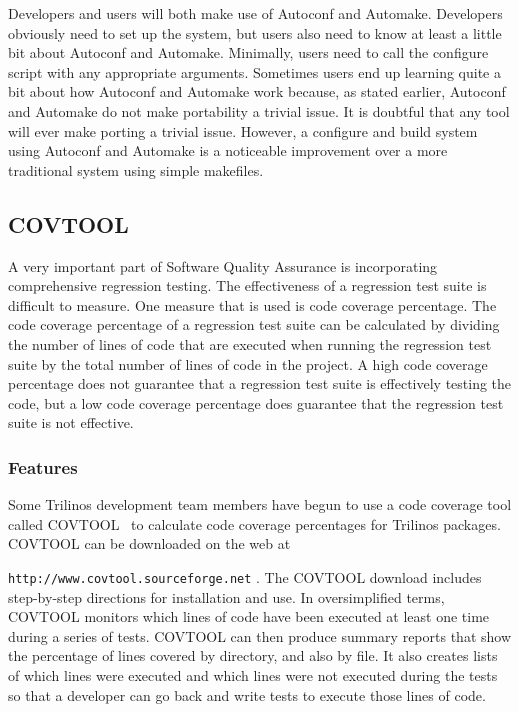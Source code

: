 \documentclass[12pt,relax]{article}
\newcommand{\InlineDirectory}[1]{
  {\hspace{0.01 in}} {\tt #1} {\hspace{0.01 in}}}
\begin{document}
Developers and users will both make use of Autoconf and Automake.  Developers 
obviously need to set up the system, but users also need to know at least a 
little bit about Autoconf and Automake.  Minimally, users need to call the 
configure script with any appropriate arguments.  Sometimes users end up 
learning quite a bit about how Autoconf and Automake work because, as stated 
earlier, Autoconf and Automake do not make portability a trivial issue.  It is 
doubtful that any tool will ever make porting a trivial issue.  However, a 
configure and build system using Autoconf and Automake is a 
noticeable improvement over a more traditional system using simple makefiles.

\subsection{COVTOOL}

A very important part of Software Quality Assurance is incorporating 
comprehensive regression testing.  The effectiveness of a regression test 
suite is 
difficult to measure.  One measure that is used is code coverage percentage.  
The code coverage percentage of a regression test suite can be calculated by 
dividing the number of lines of code that are executed when running the 
regression test suite by the total number of lines of code in the project.
A high code coverage percentage does not guarantee that a regression test 
suite is effectively testing the code, but a low code coverage percentage does 
guarantee that the regression test suite is not effective.

\subsubsection{Features}

Some Trilinos development team members have begun to use a code coverage tool 
called COVTOOL~\cite{COVTOOL} to calculate code coverage percentages for 
Trilinos packages.  COVTOOL can be downloaded on the web at \newline
\InlineDirectory{http://www.covtool.sourceforge.net}.  The COVTOOL download 
includes step-by-step directions for installation and use.  In oversimplified
terms, COVTOOL monitors which lines of code have been executed at least one 
time during a series of tests.  COVTOOL can then produce summary reports that 
show the percentage of lines covered by directory, and also by file.  It also 
creates lists of which lines were executed and which lines were not executed 
during the tests so that a developer can go back and write tests to execute 
those lines of code.
\end{document}

